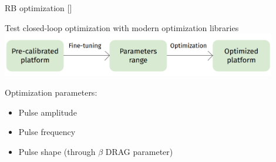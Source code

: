 \documentclass[aspectratio=169,10pt]{beamer}
\begin{document}
\begin{frame}[t,fragile]{RB optimization [\cite{kelly_optimal_2014}]}
  \begin{center}
    Test closed-loop optimization with modern optimization libraries\\
    \vspace{1.2em}
    \includegraphics[width=0.9\textwidth]{figures/opt_workflow.png}
  \end{center}
  \vspace{1.25em}
  Optimization parameters:
  \begin{itemize}
    \item Pulse amplitude
    \item Pulse frequency
    \item Pulse shape (through $\beta$ DRAG parameter)
  \end{itemize}
\end{frame}
\end{document}
